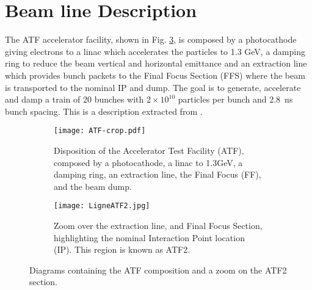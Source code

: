 {{\section{Beam line Description}
The ATF accelerator facility, shown in Fig. \ref{f:ATF}, is composed by a photocathode giving electrons to a linac which accelerates the particles to 1.3 GeV, a damping ring to reduce the beam vertical and horizontal emittance and an extraction line which provides bunch packets to the Final Focus Section (FFS) where the beam is transported to the nominal IP and dump. The goal is to generate, accelerate and damp a train of 20 bunches with $2\times10^{10}$ particles per bunch and 2.8~ns bunch spacing. This is a description extracted from \cite{ATF2prop,Alabau,Yves}.\par
\begin{figure}[htb]
\centering
\begin{subfigure}[b]{1.0\textwidth}
\texttt{[image: ATF-crop.pdf]}\caption{Disposition of the Accelerator Test Facility (ATF), composed by a photocathode, a linac to 1.3GeV, a damping ring, an extraction line, the Final Focus (FF), and the beam dump.}\label{f:ATF_ATF2}
\end{subfigure}
\begin{subfigure}[b]{1.0\textwidth}
\texttt{[image: LigneATF2.jpg]}\caption{Zoom over the extraction line, and Final Focus Section, highlighting the nominal Interaction Point location (IP). This region is known as ATF2.}\label{f:ATF2layout}
\end{subfigure}\caption{Diagrams containing the ATF composition and a zoom on the ATF2 section.}\label{f:ATF}
\end{figure}
}}
